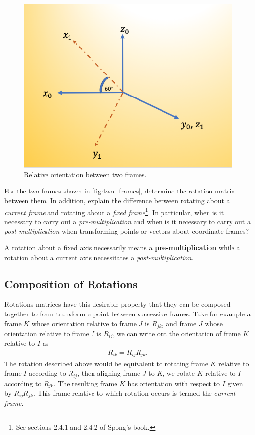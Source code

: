 \begin{figure}[tb!]
	\centering
	\includegraphics[width=.8\columnwidth]{figures/two_frames.png}
	\caption{Relative orientation between two frames.}
	\label{fig:two_frames}
\end{figure}


\noindent 
\begin{homework}
	For the two frames shown in \autoref{fig:two_frames}, determine the rotation matrix between them. In addition, explain the difference between rotating about a \textit{current frame} and rotating about a \textit{fixed frame}\footnote{See sections 2.4.1 and 2.4.2 of Spong's book.}. In particular, when is it necessary to carry out a \textit{pre-multiplication} and when is it necessary to carry out a \textit{post-multiplication} when transforming points or vectors about coordinate frames?
\end{homework}

\begin{tcolorbox}[title=Order of rotations]
	A rotation about a fixed axis necessarily means a \textbf{pre-multiplication} while a rotation about a current axis necessitates a \textit{post-multiplication}.
\end{tcolorbox}


\subsection{Composition of Rotations}
%
Rotations matrices have this desirable property that they can be composed together to form transform a point between successive frames. Take for example a frame $K$ whose orientation relative to frame $J$ is $R_{jk}$, and frame $J$ whose orientation relative to frame $I$ is $R_{ij}$, we can write out the orientation of frame $K$ relative to $I$ as 
%
\begin{align}
R_{ik} = R_{ij} R_{jk}.
\label{eq:current_frame_rotation}
\end{align}
%
The rotation described above would be equivalent to rotating frame $K$ relative to frame $I$ according to $R_{ij}$, then aligning frame $J$  to $K$, we rotate $K$ relative to $I$ according to $R_{jk}$. The resulting frame $K$ has orientation with respect to $I$ given by $R_{ij} R_{jk}$. This frame relative to which rotation occurs is termed the \textit{current frame}.

